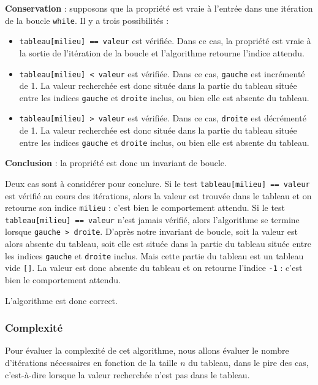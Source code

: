 \documentclass[
  a4paper,
  DIV=11,
  numbers=noendperiod]{scrartcl}
\providecommand{\tightlist}{%
  \setlength{\itemsep}{0pt}\setlength{\parskip}{0pt}}\usepackage{longtable,booktabs,array}
\begin{document}
\textbf{Conservation} : supposons que la propriété est vraie à l'entrée
dans une itération de la boucle \texttt{while}. Il y a trois
possibilités :

\begin{itemize}
\tightlist
\item
  \texttt{tableau{[}milieu{]}\ ==\ valeur} est vérifiée. Dans ce cas, la
  propriété est vraie à la sortie de l'itération de la boucle et
  l'algorithme retourne l'indice attendu.
\item
  \texttt{tableau{[}milieu{]}\ \textless{}\ valeur} est vérifiée. Dans
  ce cas, \texttt{gauche} est incrémenté de 1. La valeur recherchée est
  donc située dans la partie du tableau située entre les indices
  \texttt{gauche} et \texttt{droite} inclus, ou bien elle est absente du
  tableau.
\item
  \texttt{tableau{[}milieu{]}\ \textgreater{}\ valeur} est vérifiée.
  Dans ce cas, \texttt{droite} est décrémenté de 1. La valeur recherchée
  est donc située dans la partie du tableau située entre les indices
  \texttt{gauche} et \texttt{droite} inclus, ou bien elle est absente du
  tableau.
\end{itemize}

\textbf{Conclusion} : la propriété est donc un invariant de boucle.

Deux cas sont à considérer pour conclure. Si le test
\texttt{tableau{[}milieu{]}\ ==\ valeur} est vérifié au cours des
itérations, alors la valeur est trouvée dans le tableau et on retourne
son indice \texttt{milieu} : c'est bien le comportement attendu. Si le
test \texttt{tableau{[}milieu{]}\ ==\ valeur} n'est jamais vérifié,
alors l'algorithme se termine lorsque
\texttt{gauche\ \textgreater{}\ droite}. D'après notre invariant de
boucle, soit la valeur est alors absente du tableau, soit elle est
située dans la partie du tableau située entre les indices
\texttt{gauche} et \texttt{droite} inclus. Mais cette partie du tableau
est un tableau vide \texttt{{[}{]}}. La valeur est donc absente du
tableau et on retourne l'indice \texttt{-1} : c'est bien le comportement
attendu.

L'algorithme est donc correct.

\hypertarget{complexituxe9}{%
\subsubsection{Complexité}\label{complexituxe9}}

Pour évaluer la complexité de cet algorithme, nous allons évaluer le
nombre d'itérations nécessaires en fonction de la taille \(n\) du
tableau, dans le pire des cas, c'est-à-dire lorsque la valeur recherchée
n'est pas dans le tableau.
\end{document}
